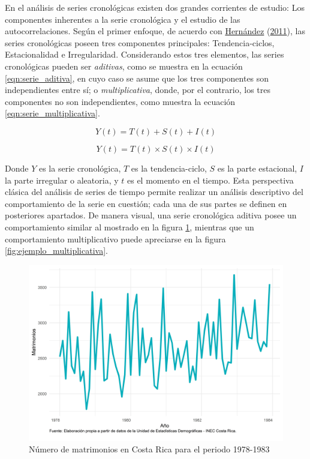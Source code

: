 \documentclass[
]{article}
\begin{document}
En el análisis de series cronológicas existen dos grandes corrientes de
estudio: Los componentes inherentes a la serie cronológica y el estudio
de las autocorrelaciones. Según el primer enfoque, de acuerdo con
\protect\hyperlink{ref-oscarh-1}{Hernández}
(\protect\hyperlink{ref-oscarh-1}{2011}), las series cronológicas poseen
tres componentes principales: Tendencia-ciclos, Estacionalidad e
Irregularidad. Considerando estos tres elementos, las series
cronológicas pueden ser \emph{aditivas}, como se muestra en la ecuación
\ref{eqn:serie_aditiva}, en cuyo caso se asume que los tres componentes
son independientes entre sí; o \emph{multiplicativa}, donde, por el
contrario, los tres componentes no son independientes, como muestra la
ecuación \ref{eqn:serie_multiplicativa}.

\begin{equation}
\label{eqn:serie_aditiva}
Y(t)=T(t)+S(t)+I(t)
\end{equation}

\begin{equation}
\label{eqn:serie_multiplicativa}
Y(t)=T(t)\times S(t)\times I(t)
\end{equation}

Donde \(Y\) es la serie cronológica, \(T\) es la tendencia-ciclo, \(S\)
es la parte estacional, \(I\) la parte irregular o aleatoria, y \(t\) es
el momento en el tiempo. Esta perspectiva clásica del análisis de series
de tiempo permite realizar un análisis descriptivo del comportamiento de
la serie en cuestión; cada una de sus partes se definen en posteriores
apartados. De manera visual, una serie cronológica aditiva posee un
comportamiento similar al mostrado en la figura
\ref{fig:ejemplo_aditiva}, mientras que un comportamiento multiplicativo
puede apreciarse en la figura \ref{fig:ejemplo_multiplicativa}.

\begin{figure}[H]
\includegraphics[width=1\linewidth,height=1\textheight]{Tesis_files/figure-latex/ejemplo_aditiva-1} \caption{Número de matrimonios en Costa Rica para el periodo 1978-1983}\label{fig:ejemplo_aditiva}
\end{figure}
\end{document}
